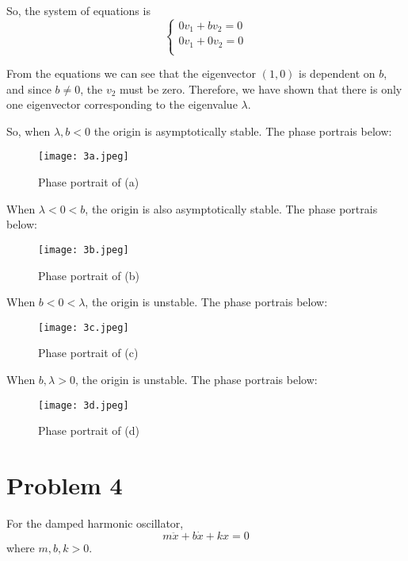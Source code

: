 \documentclass[12pt]{exam}
\begin{document}
	So, the system of equations is
	\[ \begin{cases}
		0v_1 + bv_2 = 0 \\
		0v_1 + 0v_2 = 0 \\
	\end{cases} \]

	From the equations we can see that the eigenvector $(1,0)$ is dependent on $b$, and since $b \not= 0$, the $v_2$ must be zero. Therefore, we have shown that there is only one eigenvector corresponding to the eigenvalue $\lambda$.

	So, when $\lambda, b < 0$ the origin is asymptotically stable. The phase portrais below:
	\begin{figure}[H]
		\centering
		\texttt{[image: 3a.jpeg]}
		\caption{Phase portrait of (a)}
		\label{fig:3a}
	\end{figure}

	When $\lambda <0 <b$, the origin is also asymptotically stable. The phase portrais below:
	\begin{figure}[H]
		\centering
		\texttt{[image: 3b.jpeg]}
		\caption{Phase portrait of (b)}
		\label{fig:3b}
	\end{figure}

	When $b < 0 < \lambda$, the origin is unstable. The phase portrais below:
	\begin{figure}[H]
		\centering
		\texttt{[image: 3c.jpeg]}
		\caption{Phase portrait of (c)}
		\label{fig:3c}
	\end{figure}

	When $b, \lambda > 0$, the origin is unstable. The phase portrais below:
	\begin{figure}[H]
		\centering
		\texttt{[image: 3d.jpeg]}
		\caption{Phase portrait of (d)}
		\label{fig:3d}
	\end{figure}

\newpage
\section*{Problem 4}
For the damped harmonic oscillator, 
\[ m\ddot{x} + b\dot{x} + kx = 0 \]
where $m,b,k > 0$. 
\end{document}
